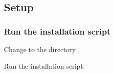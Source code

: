 \documentclass[a4paper,10pt,english]{report}
\begin{document}
\subsection{Setup}
\label{\detokenize{user/general/installation:setup}}\label{\detokenize{user/general/installation:installation-setup}}

\subsubsection{Run the installation script}
\label{\detokenize{user/general/installation:run-the-installation-script}}
Change to the  directory

Run the installation script:

\begin{sphinxVerbatim}[commandchars=\\\{\}]
 
\end{sphinxVerbatim}
\end{document}
